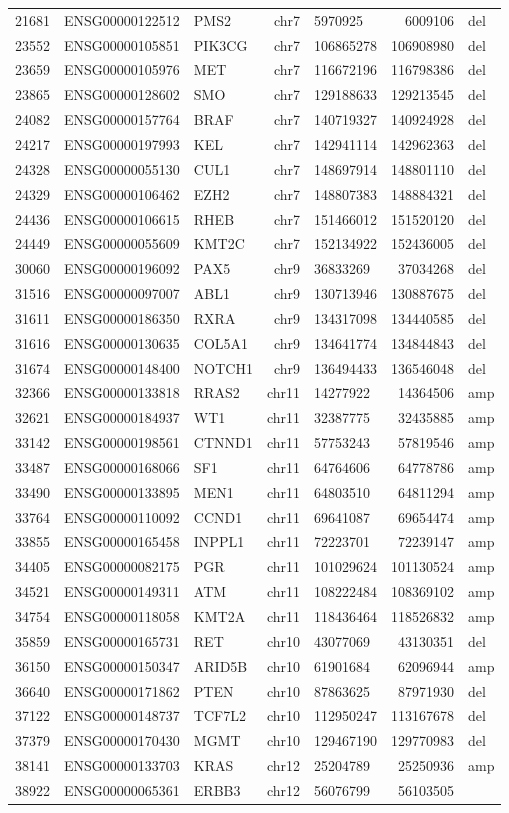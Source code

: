 \documentclass[]{article}
\begin{document}
\begin{longtable}[]{@{}rrlrlrl@{}}
21681 & ENSG00000122512 & PMS2 & chr7 & 5970925 & 6009106 &
del\tabularnewline
23552 & ENSG00000105851 & PIK3CG & chr7 & 106865278 & 106908980 &
del\tabularnewline
23659 & ENSG00000105976 & MET & chr7 & 116672196 & 116798386 &
del\tabularnewline
23865 & ENSG00000128602 & SMO & chr7 & 129188633 & 129213545 &
del\tabularnewline
24082 & ENSG00000157764 & BRAF & chr7 & 140719327 & 140924928 &
del\tabularnewline
24217 & ENSG00000197993 & KEL & chr7 & 142941114 & 142962363 &
del\tabularnewline
24328 & ENSG00000055130 & CUL1 & chr7 & 148697914 & 148801110 &
del\tabularnewline
24329 & ENSG00000106462 & EZH2 & chr7 & 148807383 & 148884321 &
del\tabularnewline
24436 & ENSG00000106615 & RHEB & chr7 & 151466012 & 151520120 &
del\tabularnewline
24449 & ENSG00000055609 & KMT2C & chr7 & 152134922 & 152436005 &
del\tabularnewline
30060 & ENSG00000196092 & PAX5 & chr9 & 36833269 & 37034268 &
del\tabularnewline
31516 & ENSG00000097007 & ABL1 & chr9 & 130713946 & 130887675 &
del\tabularnewline
31611 & ENSG00000186350 & RXRA & chr9 & 134317098 & 134440585 &
del\tabularnewline
31616 & ENSG00000130635 & COL5A1 & chr9 & 134641774 & 134844843 &
del\tabularnewline
31674 & ENSG00000148400 & NOTCH1 & chr9 & 136494433 & 136546048 &
del\tabularnewline
32366 & ENSG00000133818 & RRAS2 & chr11 & 14277922 & 14364506 &
amp\tabularnewline
32621 & ENSG00000184937 & WT1 & chr11 & 32387775 & 32435885 &
amp\tabularnewline
33142 & ENSG00000198561 & CTNND1 & chr11 & 57753243 & 57819546 &
amp\tabularnewline
33487 & ENSG00000168066 & SF1 & chr11 & 64764606 & 64778786 &
amp\tabularnewline
33490 & ENSG00000133895 & MEN1 & chr11 & 64803510 & 64811294 &
amp\tabularnewline
33764 & ENSG00000110092 & CCND1 & chr11 & 69641087 & 69654474 &
amp\tabularnewline
33855 & ENSG00000165458 & INPPL1 & chr11 & 72223701 & 72239147 &
amp\tabularnewline
34405 & ENSG00000082175 & PGR & chr11 & 101029624 & 101130524 &
amp\tabularnewline
34521 & ENSG00000149311 & ATM & chr11 & 108222484 & 108369102 &
amp\tabularnewline
34754 & ENSG00000118058 & KMT2A & chr11 & 118436464 & 118526832 &
amp\tabularnewline
35859 & ENSG00000165731 & RET & chr10 & 43077069 & 43130351 &
del\tabularnewline
36150 & ENSG00000150347 & ARID5B & chr10 & 61901684 & 62096944 &
amp\tabularnewline
36640 & ENSG00000171862 & PTEN & chr10 & 87863625 & 87971930 &
del\tabularnewline
37122 & ENSG00000148737 & TCF7L2 & chr10 & 112950247 & 113167678 &
del\tabularnewline
37379 & ENSG00000170430 & MGMT & chr10 & 129467190 & 129770983 &
del\tabularnewline
38141 & ENSG00000133703 & KRAS & chr12 & 25204789 & 25250936 &
amp\tabularnewline
38922 & ENSG00000065361 & ERBB3 & chr12 & 56076799 & 56103505 &

\end{longtable}
\end{document}
